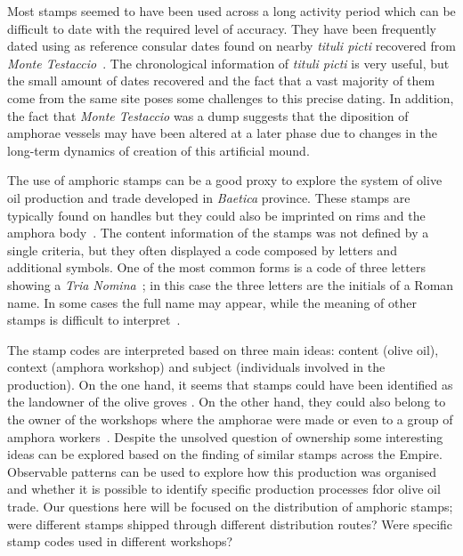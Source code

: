Most stamps seemed to have been used across a long activity period which can be difficult to date with the required level of accuracy. They have been frequently dated using as reference consular dates found on nearby \textit{tituli picti} recovered from \textit{Monte Testaccio}~\citep{Testaccio1, berni_millet_epigrafianforica_2008}.
The chronological information of \textit{tituli picti} is very useful, but the small amount of dates recovered and the fact that a vast majority of them come from the same site poses some challenges to this precise dating. In addition, the fact that \textit{Monte Testaccio} was a dump suggests that the diposition of amphorae vessels may have been altered at a later phase due to changes in the long-term dynamics of creation of this artificial mound.

The use of amphoric stamps can be a good proxy to explore the system of olive oil production and trade developed in \textit{Baetica} province. These stamps are typically found on handles but they could also be imprinted on rims and the amphora body~\citep{millet_anforas_1998}. The content information of the stamps was not defined by a single criteria, but they often displayed a code composed by letters and additional symbols. One of the most common forms is a code of three letters showing a \textit{Tria Nomina}~\citep{berni_millet_amphora_1996}; in this case the three letters are the initials of a Roman name. In some cases the full name may appear, while the meaning of other stamps is difficult to interpret~\citep{rodriguez_baetican_1998}. 

The stamp codes are interpreted based on three main ideas: content (olive oil), context (amphora workshop) and subject (individuals involved in the production). On the one hand, it seems that stamps could have been identified as the landowner of the olive groves \citep{rodriguez_economioleicola_1977}. On the other hand, they could also belong to the owner of the workshops where the amphorae were made or even to a group of amphora workers~\citep{berni_millet_epigrafianforica_2008}. Despite the unsolved question of ownership some interesting ideas can be explored based on the finding of similar stamps across the Empire. Observable patterns can be used to explore how this production was organised and whether it is possible to identify specific production processes fdor olive oil trade. Our questions here will be focused on the distribution of amphoric stamps; were different stamps shipped through different distribution routes? Were specific stamp codes used in different workshops?

